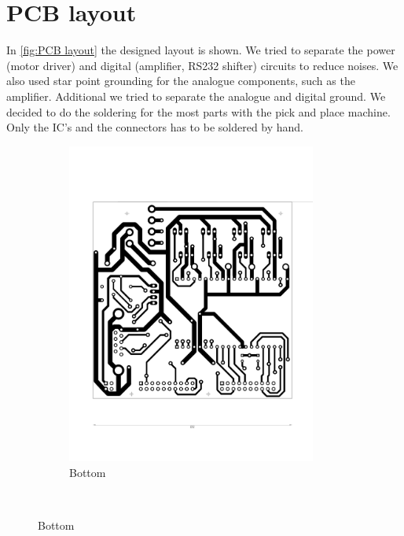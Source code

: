 \documentclass[a4paper,12pt]{scrreprt}
\begin{document}
\section{\acs{PCB} layout}
In \autoref{fig:PCB layout} the designed layout is shown. We tried to separate the power (motor driver) and digital (amplifier, \acs{RS232} shifter) circuits to reduce noises. We also used star point grounding for the analogue components, such as the amplifier. Additional we tried to separate the analogue and digital ground. We decided to do the soldering for the most parts with the pick and place machine. Only the \acs{IC}'s and the connectors has to be soldered by hand.
  \begin{figure} [H]
        \centering
        \begin{subfigure}[b]{0.65\textwidth}
                \centering
                \includegraphics[width=0.9\textwidth]{pictures/PCB_BOTTOM_v_2_0.pdf}
                \caption{Bottom}\label{fig:pcb_bottom}
        \end{subfigure}%
        ~ %
          

\end{figure}
\end{document}
